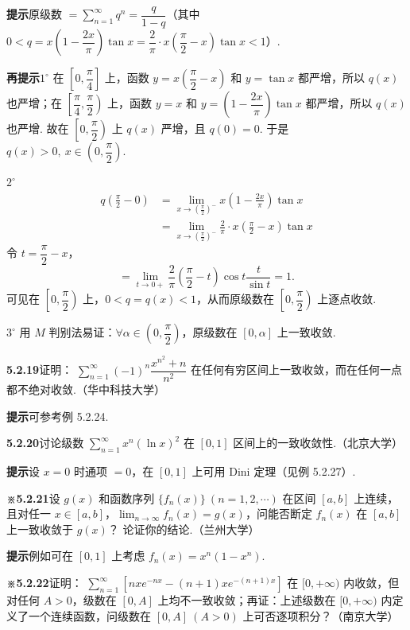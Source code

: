\documentclass[UTF8, 12pt, fontset=fandol, oneside]{ctexart}
\begin{document}
\noindent\textbf{提示}\quad 原级数
$\displaystyle=\sum_{n=1}^{\infty}q^n=\dfrac q{1-q}$（其中
$0<q=x\left(1-\dfrac{2x}{\pi}\right)\tan x
=\dfrac2\pi\cdot x\left(\dfrac\pi2-x\right)\tan x<1$）.

\noindent\textbf{再提示}\quad $1^\circ$ 在 $\left[0,\dfrac\pi4\right]$ 上，函数
$y=x\left(\dfrac\pi2-x\right)$ 和 $y=\tan x$ 都严增，所以 $q(x)$ 也严增；在
$\left[\dfrac\pi4,\dfrac\pi2\right)$ 上，函数 $y=x$ 和
$y=\left(1-\dfrac{2x}{\pi}\right)\tan x$ 都严增，所以 $q(x)$ 也严增. 故在
$\left[0,\dfrac\pi2\right)$ 上 $q(x)$ 严增，且 $q(0)=0$. 于是
$q(x)>0,\ x\in\left(0,\dfrac\pi2\right)$.

$2^\circ$
\[
\begin{aligned}
q\left(\frac\pi2-0\right)
&=\lim_{x\to(\frac\pi2)^-}x\left(1-\frac{2x}{\pi}\right)\tan x\\
&=\lim_{x\to(\frac\pi2)^-}\frac2\pi\cdot x\left(\frac\pi2-x\right)\tan x
\end{aligned}
\]
令 $t=\dfrac\pi2-x$，
\[
  =\lim_{t\to0+}\frac2\pi\left(\frac\pi2-t\right)\cos t\frac t{\sin t}=1.
\]
可见在 $\left[0,\dfrac\pi2\right)$ 上，$0<q=q(x)<1$，从而原级数在
$\left[0,\dfrac\pi2\right)$ 上逐点收敛.

$3^\circ$ 用 $M$ 判别法易证：$\forall\alpha\in\left(0,\dfrac\pi2\right)$，原级数在 $[0,\alpha]$ 上一致收敛.

\noindent\textbf{5.2.19}\quad 证明：
$\displaystyle\sum_{n=1}^{\infty}(-1)^n\dfrac{x^{n^2}+n}{n^2}$ 在任何有穷区间上一致收敛，而在任何一点都不绝对收敛.（华中科技大学）

\noindent\textbf{提示}\quad 可参考例 5.2.24.

\noindent\textbf{5.2.20}\quad 讨论级数 $\displaystyle\sum_{n=1}^{\infty}x^n(\ln x)^2$ 在 $[0,1]$ 区间上的一致收敛性.（北京大学）

\noindent\textbf{提示}\quad 设 $x=0$ 时通项 $=0$，在 $[0,1]$ 上可用 Dini 定理（见例 5.2.27）.

\noindent\textbf{※5.2.21}\quad 设 $g(x)$ 和函数序列 $\{f_n(x)\}\ (n=1,2,\cdots)$ 在区间 $[a,b]$ 上连续，且对任一
$x\in[a,b]$，$\displaystyle\lim_{n\to\infty}f_n(x)=g(x)$，问能否断定 $f_n(x)$ 在 $[a,b]$ 上一致收敛于 $g(x)$？
论证你的结论.（兰州大学）

\noindent\textbf{提示}\quad 例如可在 $[0,1]$ 上考虑 $f_n(x)=x^n(1-x^n)$.

\noindent\textbf{※5.2.22}\quad 证明：
$\displaystyle\sum_{n=1}^{\infty}\left[nxe^{-nx}-(n+1)xe^{-(n+1)x}\right]$ 在 $[0,+\infty)$ 内收敛，但对任何
$A>0$，级数在 $[0,A]$ 上均不一致收敛；再证：上述级数在 $[0,+\infty)$ 内定义了一个连续函数，问级数在
$[0,A]\ (A>0)$ 上可否逐项积分？（南京大学）
\end{document}

